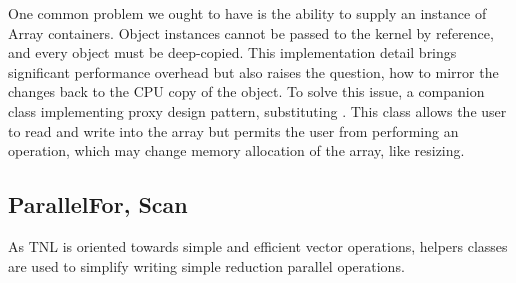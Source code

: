 One common problem we ought to have is the ability to supply an instance of Array containers. Object instances cannot be passed to the kernel by reference, and every object must be deep-copied. This implementation detail brings significant performance overhead but also raises the question, how to mirror the changes back to the CPU copy of the object. To solve this issue, a companion class  implementing proxy design pattern, substituting . This class allows the user to read and write into the array but permits the user from performing an operation, which may change memory allocation of the array, like resizing. 

\subsection{ParallelFor, Scan}

As TNL is oriented towards simple and efficient vector operations, helpers classes are used to simplify writing simple reduction parallel operations. 

